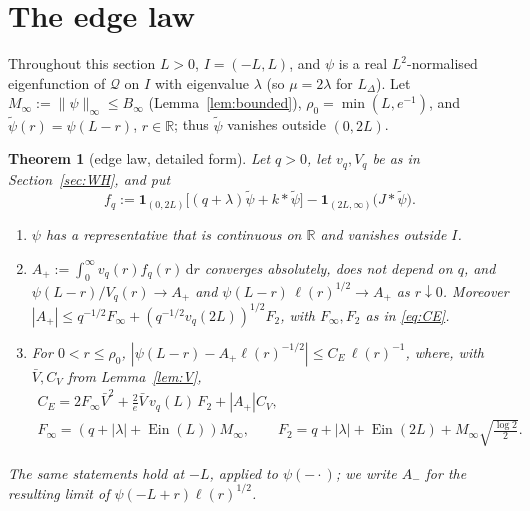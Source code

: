 \documentclass[11pt]{amsart}
\newcommand{\R}{\mathbb{R}}
\newcommand{\LD}{L_\Delta}
\newcommand{\one}{\mathbf{1}}
\newcommand{\dd}{\,\mathrm{d}}
\DeclareMathOperator{\Ein}{Ein}
\newtheorem{theorem}{Theorem}[section]
\theoremstyle{definition}
\theoremstyle{remark}
\numberwithin{equation}{section}
\begin{document}
\section{The edge law}\label{sec:edge}

Throughout this section $L>0$, $I=(-L,L)$, and $\psi$ is a real $L^2$-normalised eigenfunction of $\mathcal Q$ on $I$ with eigenvalue $\lambda$ (so $\mu=2\lambda$ for $\LD$). Let $M_\infty:=\|\psi\|_\infty\le B_\infty$ (Lemma~\ref{lem:bounded}), $\rho_0=\min(L,e^{-1})$, and $\tilde\psi(r)=\psi(L-r)$, $r\in\R$; thus $\tilde\psi$ vanishes outside $(0,2L)$.

\begin{theorem}[edge law, detailed form]\label{thm:edge}
Let $q>0$, let $v_q,V_q$ be as in Section~\ref{sec:WH}, and put
\[
f_q:=\one_{(0,2L)}\bigl[(q+\lambda)\tilde\psi+k*\tilde\psi\bigr]-\one_{(2L,\infty)}\bigl(J*\tilde\psi\bigr).
\]
\begin{enumerate}
\item[(i)] $\psi$ has a representative that is continuous on $\R$ and vanishes outside $I$.
\item[(ii)] $A_+:=\int_0^\infty v_q(r)f_q(r)\dd r$ converges absolutely, does not depend on $q$, and $\psi(L-r)/V_q(r)\to A_+$ and $\psi(L-r)\,\ell(r)^{1/2}\to A_+$ as $r\downarrow0$. Moreover $|A_+|\le q^{-1/2}F_\infty+(q^{-1/2}v_q(2L))^{1/2}F_2$, with $F_\infty,F_2$ as in \eqref{eq:CE}.
\item[(iii)] For $0<r\le\rho_0$, $|\psi(L-r)-A_+\ell(r)^{-1/2}|\le C_E\,\ell(r)^{-1}$, where, with $\bar V,C_V$ from Lemma~\ref{lem:V},
\begin{equation}\label{eq:CE}
\begin{gathered}
C_E=2F_\infty\bar V^2+\tfrac2e\bar V\,v_q(L)\,F_2+|A_+|C_V,\\
F_\infty=(q+|\lambda|+\Ein(L))M_\infty,\qquad F_2=q+|\lambda|+\Ein(2L)+M_\infty\sqrt{\tfrac{\log 2}2}.
\end{gathered}
\end{equation}
\end{enumerate}
The same statements hold at $-L$, applied to $\psi(-\cdot)$; we write $A_-$ for the resulting limit of $\psi(-L+r)\ell(r)^{1/2}$.
\end{theorem}
\end{document}
